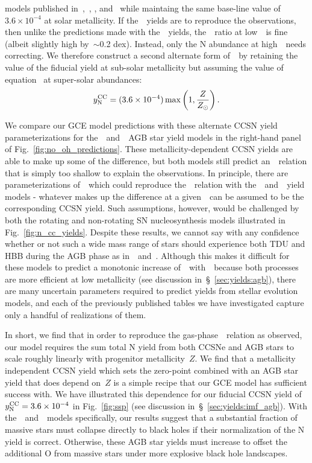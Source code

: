\documentclass[ms.tex]{subfiles}
\begin{document}
models published in~\citet{Limongi2018},~\citet{Sukhbold2016},
\citet{Nomoto2013}, and~\citet{Woosley1995} while maintaing the same base-line
value of~$3.6\times10^{-4}$ at solar metallicity.
If the~\karakas~yields are to reproduce the observations, then unlike the
predictions made with the~\karakasten~yields, the~\no~ratio at low~\oh~is
fine (albeit slightly high by~$\sim$0.2 dex).
Instead, only the N abundance at high~\oh~needs correcting.
We therefore construct a second alternate form of~~by retaining the
value of the fiducial yield at sub-solar metallicity but assuming the value of
equation~ at super-solar abundances:
\begin{equation}
y_\text{N}^\text{CC} = (3.6\times10^{-4})\max\left(1, \frac{Z}{Z_\odot}\right).
\label{eq:broken_yncc}
\end{equation}
\par
We compare our GCE model predictions with these alternate CCSN yield
parameterizations for the~\karakasten~and~\karakas~AGB star yield models in
the right-hand panel of Fig.~\ref{fig:no_oh_predictions}.
These metallicity-dependent CCSN yields are able to make up some of the
difference, but both models still predict an~\ohno~relation that is simply
too shallow to explain the observations.
In principle, there are parameterizations of~~which could reproduce
the~\ohno~relation with the~\karakasten~and~\karakas~yield models - whatever
makes up the difference at a given~\oh~can be assumed to be the corresponding
CCSN yield.
Such assumptions, however, would be challenged by both the rotating and
non-rotating SN nucleosynthesis models illustrated in
Fig.~\ref{fig:n_cc_yields}.
Despite these results, we cannot say with any confidence whether or not such
a wide mass range of stars should experience both TDU and HBB during the AGB
phase as in~\karakasten~and~\karakas.
Although this makes it difficult for these models to predict a monotonic
increase of~\no~with~\oh~because both processes are more efficient at low
metallicity (see discussion in~\S~\ref{sec:yields:agb}), there are many
uncertain parameters required to predict yields from stellar evolution models,
and each of the previously published tables we have investigated capture only
a handful of realizations of them.
\par
In short, we find that in order to reproduce the gas-phase~\ohno~relation as
observed, our model requires the sum total N yield from both CCSNe and AGB
stars to scale roughly linearly with progenitor metallicity~$Z$.
We find that a metallicity independent CCSN yield which sets the zero-point
combined with an AGB star yield that does depend on~$Z$ is a simple recipe
that our GCE model has sufficient success with.
We have illustrated this dependence for our fiducial CCSN yield of
$y_\text{N}^\text{CC} = 3.6\times10^{-4}$ in Fig.~\ref{fig:ssp} (see discussion
in~\S~\ref{sec:yields:imf_agb}).
With the~\cristallo~and~\ventura~models specifically, our results suggest that
a substantial fraction of massive stars must collapse directly to black holes
if their normalization of the N yield is correct.
Otherwise, these AGB star yields must increase to offset the additional O
from massive stars under more explosive black hole landscapes.
\end{document}
